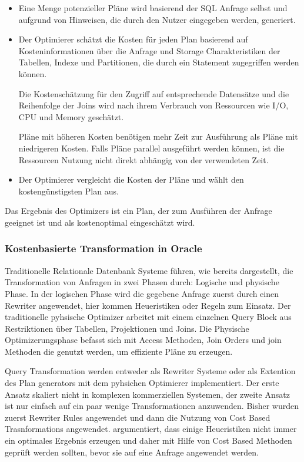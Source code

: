 \begin{itemize}
\item Eine Menge potenzieller Pläne wird basierend der SQL Anfrage selbst und aufgrund von Hinweisen, die durch den Nutzer eingegeben werden, generiert.
\item Der Optimierer schätzt die Kosten für jeden Plan basierend auf Kosteninformationen über die Anfrage und Storage Charakteristiken der Tabellen, Indexe und Partitionen, die durch ein Statement zugegriffen werden können.

Die Kostenschätzung für den Zugriff auf entsprechende Datensätze und die Reihenfolge der Joins wird nach ihrem Verbrauch von Ressourcen wie I/O, CPU und Memory geschätzt.

Pläne mit höheren Kosten benötigen mehr Zeit zur Ausführung als Pläne mit niedrigeren Kosten. Falls Pläne parallel ausgeführt werden können, ist die Ressourcen Nutzung nicht direkt abhängig von der verwendeten Zeit.

\item Der Optimierer vergleicht die Kosten der Pläne und wählt den kostengünstigsten Plan aus.
\end{itemize}

Das Ergebnis des Optimizers ist ein Plan, der zum Ausführen der Anfrage geeignet ist und als kostenoptimal eingeschätzt wird.


\subsubsection{Kostenbasierte Transformation in Oracle}

Traditionelle Relationale Datenbank Systeme führen, wie bereits dargestellt, die Transformation von Anfragen in zwei Phasen durch: Logische und physische Phase. In der logischen Phase wird die gegebene Anfrage zuerst durch einen Rewriter angewendet, hier kommen Heueristiken oder Regeln zum Einsatz. Der traditionelle pyhsische Optimizer arbeitet mit einem einzelnen Query Block aus Restriktionen über Tabellen, Projektionen und Joins. Die Physische Optimizerungsphase befasst sich mit Access Methoden, Join Orders und join Methoden die genutzt werden, um effiziente Pläne zu erzeugen.

Query Transformation werden entweder als Rewriter Systeme oder als Extention des Plan generators mit dem pyhsichen Optimierer implementiert. Der erste Ansatz skaliert nicht in komplexen kommerziellen Systemen, der zweite Ansatz ist nur einfach auf ein paar wenige Transformationen anzuwenden. 
Bisher wurden zuerst Rewriter Rules angewendet und dann die Nutzung von Cost Based Trasnformations angewendet. \cite{ahmed2006cost} argumentiert, dass einige Heueristiken nicht immer ein optimales Ergebnis erzeugen und daher mit Hilfe von Cost Based Methoden geprüft werden sollten, bevor sie auf eine Anfrage angewendet werden.


